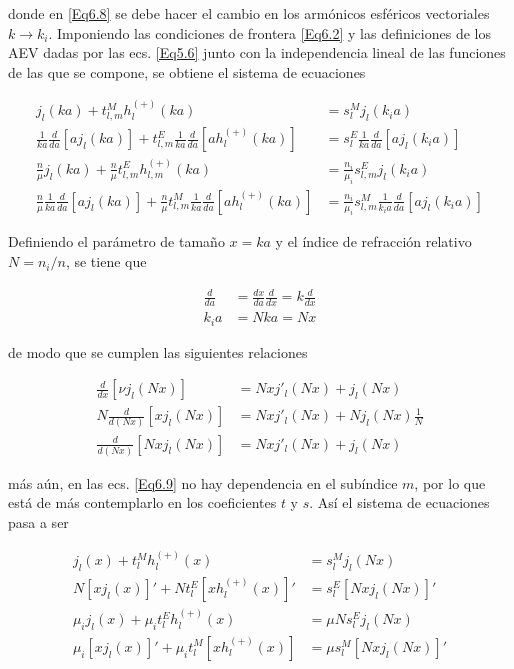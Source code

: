 \documentclass[a4paper,10pt]{article}
\begin{document}
donde en \eqref{Eq6.8} se debe hacer el cambio en los armónicos esféricos vectoriales $k\rightarrow k_i$. Imponiendo las condiciones de frontera \eqref{Eq6.2} y las definiciones de los AEV dadas por las ecs. \eqref{Eq5.6} junto con la independencia lineal de las funciones de las que se compone, se obtiene el sistema de ecuaciones

\begin{subequations}
\begin{align}
j_l(ka)+t_{l,m}^M h_l^{(+)}(ka)&=s_l^M j_l(k_i a)	\\
\frac{1}{ka}\frac{d}{da}[aj_l(ka)]+t_{l,m}^E\frac{1}{ka}\frac{d}{da}[ah_l^{(+)}(ka)]&=s_l^E\frac{1}{ka}\frac{d}{da}[aj_l(k_i a)]	\\
\frac{n}{\mu}j_l(ka)+\frac{n}{\mu}t_{l,m}^E h_{l,m}^{(+)}(ka)&=\frac{n_i}{\mu_i}s_{l,m}^Ej_l(k_i a)	\\
\frac{n}{\mu}\frac{1}{ka}\frac{d}{da}[aj_l(ka)]+\frac{n}{\mu}t_{l,m}^M\frac{1}{ka}\frac{d}{da}[ah_l^{(+)}(ka)]&=\frac{n_i}{\mu_i}s_{l,m}^M\frac{1}{k_i a}\frac{d}{da}[aj_l(k_ia)]
\end{align}
\label{Eq6.9}
\end{subequations}

Definiendo el parámetro de tamaño $x=ka$ y el índice de refracción relativo $N=n_i/n$, se tiene que

\begin{equation}
\begin{aligned}
\frac{d}{da}&=\frac{dx}{da}\frac{d}{dx}=k\frac{d}{dx}\\
k_ia&=Nka=Nx
\end{aligned}
\end{equation}

de modo que se cumplen las siguientes relaciones

\begin{subequations}
\begin{align}
\frac{d}{dx}[\nu j_l(Nx)]&=Nx j'_l(Nx)+j_l(Nx)	\\
N\frac{d}{d(Nx)}[x j_l(Nx)]&=Nx j'_l(Nx)+Nj_l(Nx)\frac{1}{N}	\\
\frac{d}{d(Nx)}[Nx j_l(Nx)]&=Nx j'_l(Nx)+j_l(Nx)
\end{align}
\end{subequations}

más aún, en las ecs. \eqref{Eq6.9} no hay dependencia en el subíndice $m$, por lo que está de más contemplarlo en los coeficientes $t$ y $s$. Así el sistema de ecuaciones pasa a ser

\begin{subequations}
\begin{align}
j_l(x)+t_l^M h_l^{(+)}(x)						&=	s_l^M j_l(Nx)	\label{Eq6.12a}\\
N[xj_l(x)]'+N	t_l^E	[xh_l^{(+)}(x)]'	&=	s_l^E[Nx j_l(Nx)]'	\label{Eq6.12b}	\\
\mu_i j_l(x)+\mu_i t_l^E h_l^{(+)}(x)	&= 	\mu N s_l^E j_l(Nx)	\label{Eq6.12c}	\\
\mu_i [x j_l(x)]'+\mu_i t_l^M [x h_l^{(+)}(x)]	&=\mu s_l^M [Nx j_l(Nx)]'	\label{Eq6.12d}
\end{align}
\label{Eq6.12}
\end{subequations}
\end{document}
